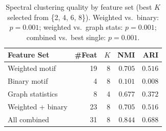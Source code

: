 \begin{table}[t]
\centering
\caption{Spectral clustering quality by feature set (best $K$ selected from \{2, 4, 6, 8\}). Weighted vs.\ binary: $p=0.001$; weighted vs.\ graph stats: $p=0.001$; combined vs.\ best single: $p=0.001$.}
\label{table:clustering}
\begin{tabular}{lrrrr}
\toprule
Feature Set & \#Feat & $K$ & NMI & ARI \\
\midrule
    Weighted motif       &  19 & 8 & $0.705$ & $0.516$ \\
    Binary motif         &   4 & 8 & $0.101$ & $0.008$ \\
    Graph statistics     &   8 & 4 & $0.677$ & $0.372$ \\
    Weighted + binary    &  23 & 8 & $0.705$ & $0.516$ \\
    All combined         &  31 & 8 & $0.844$ & $0.688$ \\
\bottomrule
\end{tabular}
\end{table}